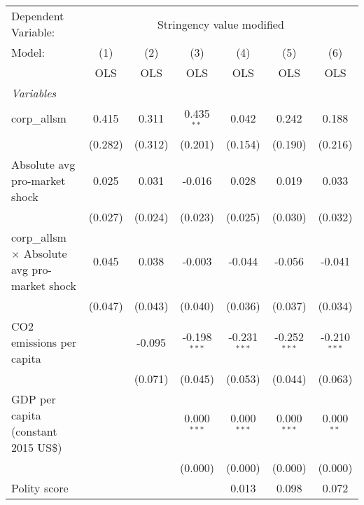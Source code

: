 
\begingroup
\centering
\begin{tabular}{lcccccc}
   \toprule
   Dependent Variable: & \multicolumn{6}{c}{Stringency value modified}\\
   Model:                                               & (1)     & (2)     & (3)            & (4)            & (5)            & (6)\\  
                                                        &  OLS    & OLS     & OLS            & OLS            & OLS            & OLS\\  
   \midrule
   \emph{Variables}\\
   corp\_allsm                                          & 0.415   & 0.311   & 0.435$^{**}$   & 0.042          & 0.242          & 0.188\\   
                                                        & (0.282) & (0.312) & (0.201)        & (0.154)        & (0.190)        & (0.216)\\   
   Absolute avg pro-market shock                        & 0.025   & 0.031   & -0.016         & 0.028          & 0.019          & 0.033\\   
                                                        & (0.027) & (0.024) & (0.023)        & (0.025)        & (0.030)        & (0.032)\\   
   corp\_allsm $\times$ Absolute avg pro-market shock   & 0.045   & 0.038   & -0.003         & -0.044         & -0.056         & -0.041\\   
                                                        & (0.047) & (0.043) & (0.040)        & (0.036)        & (0.037)        & (0.034)\\   
   CO2 emissions per capita                             &         & -0.095  & -0.198$^{***}$ & -0.231$^{***}$ & -0.252$^{***}$ & -0.210$^{***}$\\   
                                                        &         & (0.071) & (0.045)        & (0.053)        & (0.044)        & (0.063)\\   
   GDP per capita (constant 2015 US\$)                  &         &         & 0.000$^{***}$  & 0.000$^{***}$  & 0.000$^{***}$  & 0.000$^{**}$\\   
                                                        &         &         & (0.000)        & (0.000)        & (0.000)        & (0.000)\\   
   Polity score                                         &         &         &                & 0.013          & 0.098          & 0.072\\   

\end{tabular}
